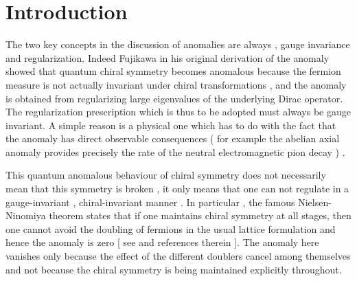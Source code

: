 \documentclass[a4paper,10pt]{article}
\begin{document}
\setcounter{page}{1}

\section{Introduction}

The two key concepts in the discussion of anomalies are always ,
gauge invariance and regularization. Indeed Fujikawa
\cite{fujikawa} in his original derivation of the anomaly showed
that quantum chiral symmetry becomes anomalous because the
fermion measure is not actually invariant under chiral
transformations , and the anomaly is obtained from regularizing
large eigenvalues of the underlying Dirac operator. The
regularization prescription which is thus to be adopted must
always be gauge invariant. A simple reason is a physical one
which has to do with the fact that the anomaly has direct
observable consequences ( for example the abelian \coordHE{} axial
anomaly provides precisely the rate of the neutral
electromagnetic pion decay \coordHE{} ) .



This quantum anomalous behaviour of chiral symmetry does not
necessarily mean that this symmetry is broken , it only means that
one can not regulate in a gauge-invariant , chiral-invariant
manner . In particular , the famous Nielsen-Ninomiya theorem
\cite{nielsen-ninomiya} states that if one maintains chiral
symmetry at all stages, then one cannot avoid the doubling of
fermions in the usual lattice formulation and hence the anomaly
is zero [ see \cite{creutz} and references therein ]. The anomaly
here vanishes only because the effect of the different doublers
cancel among themselves and not because the chiral symmetry is
being maintained explicitly throughout.
\end{document}
